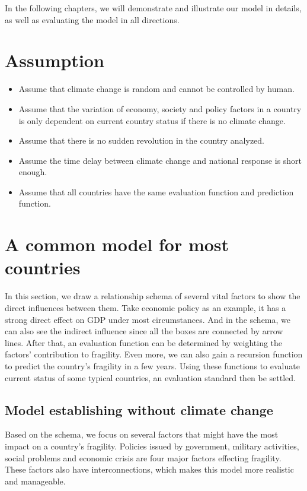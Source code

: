 \documentclass{mcmthesis}
\begin{document}
In the following chapters, we will demonstrate and illustrate our model in details, as well as evaluating the model in all directions.

\section{Assumption}

\begin{itemize}
\item Assume that climate change is random and cannot be controlled by human.

\item Assume that the variation of economy, society and policy factors in a country is only dependent on current country status if there is no climate change.

\item Assume that there is no sudden revolution in the country analyzed.

\item Assume the time delay between climate change and national response is short enough.

\item Assume that all countries have the same evaluation function and prediction function.

\end{itemize}

\section{A common model for most countries}
In this section, we draw a relationship schema of several vital factors to show the direct influences between them. Take economic policy as an example, it has a strong direct effect on GDP under most circumstances. And in the schema, we can also see the indirect influence since all the boxes are connected by arrow lines. After that, an evaluation function can be determined by weighting the factors’ contribution to fragility. Even more, we can also gain a recursion function to predict the country's fragility in a few years. Using these functions to evaluate current status of some typical countries, an evaluation standard then be settled.

\subsection{Model establishing without climate change}
Based on the schema, we focus on several factors that might have the most impact on a country's fragility. Policies issued by government, military activities, social problems and economic crisis are four major factors effecting fragility. These factors also have interconnections, which makes this model more realistic and manageable.
\end{document}
